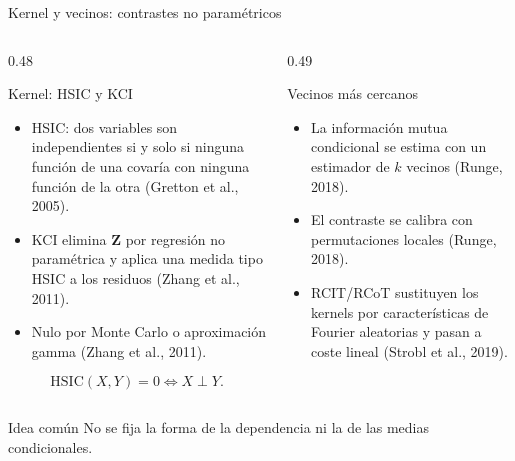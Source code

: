 \documentclass[aspectratio=169,11pt]{beamer}
\newcommand{\srccite}[1]{{\scriptsize\color{upmgray}(#1)}}
\begin{document}
\begin{frame}[t]{Kernel y vecinos: contrastes no paramétricos}
  \small
  \begin{columns}[T,onlytextwidth]
    \begin{column}{0.48\textwidth}
      \begin{block}{Kernel: HSIC y KCI}
        \begin{itemize}
          \item HSIC: dos variables son independientes si y solo si ninguna
                función de una covaría con ninguna función de la otra
                \srccite{Gretton et al., 2005}.
          \item KCI elimina $\mathbf Z$ por regresión no paramétrica y aplica
                una medida tipo HSIC a los residuos \srccite{Zhang et al., 2011}.
          \item Nulo por Monte Carlo o aproximación gamma
                \srccite{Zhang et al., 2011}.
        \end{itemize}
        \[
          \mathrm{HSIC}(X,Y)=0\iff X\perp Y.
        \]
      \end{block}
    \end{column}
    \begin{column}{0.49\textwidth}
      \begin{block}{Vecinos más cercanos}
        \begin{itemize}
          \item La información mutua condicional se estima con un estimador
                de $k$ vecinos \srccite{Runge, 2018}.
          \item El contraste se calibra con permutaciones locales
                \srccite{Runge, 2018}.
          \item RCIT/RCoT sustituyen los kernels por características de
                Fourier aleatorias y pasan a coste lineal
                \srccite{Strobl et al., 2019}.
        \end{itemize}
      \end{block}
    \end{column}
  \end{columns}
  \vspace{-2pt}
  {\small
  \begin{alertblock}{Idea común}
    No se fija la forma de la dependencia ni la de las medias condicionales.
  \end{alertblock}}
\end{frame}
\end{document}
